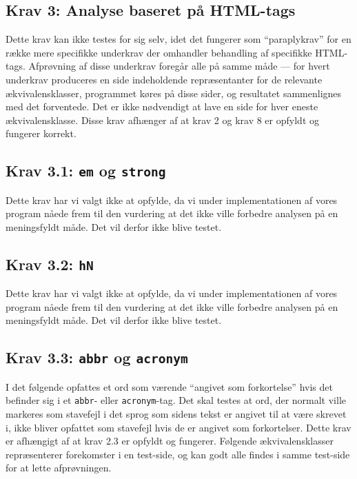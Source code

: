 \documentclass[a4paper,oneside,article]{memoir}
\begin{document}
\begin{landscape}
\section{Krav 3: Analyse baseret på HTML-tags}

Dette krav kan ikke testes for sig selv, idet det fungerer som
``paraplykrav'' for en række mere specifikke underkrav der omhandler
behandling af specifikke HTML-tags. Afprøvning af disse underkrav
foregår alle på samme måde --- for hvert underkrav produceres en side
indeholdende repræsentanter for de relevante ækvivalensklasser,
programmet køres på disse sider, og resultatet sammenlignes med det
forventede. Det er ikke nødvendigt at lave en side for hver eneste
ækvivalensklasse. Disse krav afhænger af at krav 2 og krav 8 er
opfyldt og fungerer korrekt.

\subsection{Krav 3.1: \texttt{em} og \texttt{strong}}

Dette krav har vi valgt ikke at opfylde, da vi under implementationen
af vores program nåede frem til den vurdering at det ikke ville
forbedre analysen på en meningsfyldt måde. Det vil derfor ikke blive
testet.

\subsection{Krav 3.2: \texttt{hN}}

Dette krav har vi valgt ikke at opfylde, da vi under implementationen
af vores program nåede frem til den vurdering at det ikke ville
forbedre analysen på en meningsfyldt måde. Det vil derfor ikke blive
testet.

\subsection{Krav 3.3: \texttt{abbr} og \texttt{acronym}}

I det følgende opfattes et ord som værende ``angivet som forkortelse''
hvis det befinder sig i et \texttt{abbr}- eller
\texttt{acronym}-tag. Det skal testes at ord, der normalt ville
markeres som stavefejl i det sprog som sidens tekst er angivet til at
være skrevet i, ikke bliver opfattet som stavefejl hvis de er angivet
som forkortelser. Dette krav er afhængigt af at krav 2.3 er opfyldt og
fungerer. Følgende ækvivalensklasser repræsenterer forekomster i en
test-side, og kan godt alle findes i samme test-side for at lette
afprøvningen.


\end{landscape}
\end{document}
